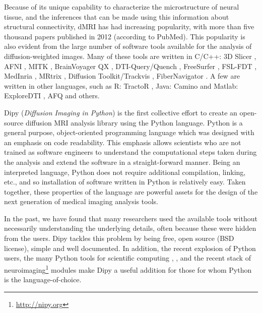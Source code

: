 \documentclass{bioinfo}
\begin{document}
Because of its unique capability to characterize the microstructure of neural
tissue, and the inferences that can be made using this information about
structural connectivity, dMRI has had increasing popularity, with more than five
thousand papers published in 2012 (according to PubMed). This popularity is
also evident from the large number of software tools available for the analysis
of diffusion-weighted images. Many of these tools are written in C/C++: 3D
Slicer \citep{pieper:06}, AFNI \citep{cox-afni:12}, MITK
\citep{fritzsche-mitk:12}, BrainVoyager QX \citep{goebel-brainvoyager:12},
DTI-Query/Quench \citep{sherbondy:05}, FreeSurfer \citep{fischl-freesurfer:12},
FSL-FDT \citep{smith-fdt:04}, MedInria \citep{toussaint-souplet-etal:07},
MRtrix \citep{Tournier2012}, Diffusion Toolkit/Trackvis
\citep{wang-diffusion-toolkit:07}, FiberNavigator \citep{vaillancourt:11,
  chamberland:13}. A few are written in other languages, such as R:
TractoR \citep{ clayden-TractoR:11}, Java: Camino \citep{Cook2006} and Matlab:
ExploreDTI \citep{leemans-exploredti:09}, AFQ \citep{yeatman2012afq} and
others.

Dipy (\textit{Diffusion Imaging in Python}) \citep{garyfallidis2011dipy} is
the first collective effort to create an open-source diffusion MRI analysis
library using the Python language. Python is a general purpose, object-oriented
programming language which was designed with an emphasis on code readability.
This emphasis allows scientists who are not trained as software engineers to
understand the computational steps taken during the analysis and extend the software in a
straight-forward manner. Being an interpreted language, Python does not require
additional compilation, linking, etc., and so installation of software written
in Python is relatively easy. Taken together, these properties of the language
are powerful assets for the design of the next generation of medical imaging
analysis tools.


In the past, we have found that many researchers used the available
tools without necessarily understanding the underlying details, often because these
were hidden from the users. Dipy tackles this problem by being free, open
source (BSD license), simple and well documented. In addition, the recent
explosion of Python users, the many Python tools for scientific computing
\citep{perez_python:11}, \citep{mckinney_python:12}, \citep{perez_ipython:07}
and the recent stack of neuroimaging\footnote{\url{http://nipy.org}} modules
make Dipy a useful addition for those for whom Python is the
language-of-choice.
\end{document}
